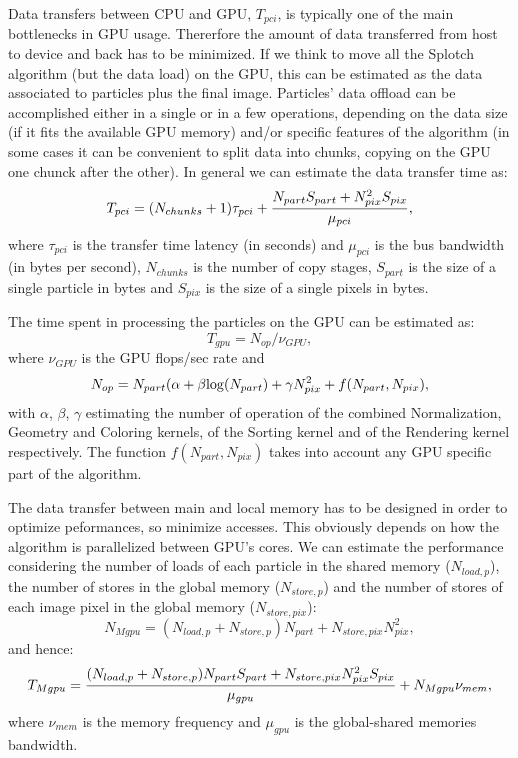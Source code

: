 \documentclass[11pt]{article}
\begin{document}
Data transfers between CPU and GPU, $T_{pci}$, is typically one of the main 
bottlenecks in GPU usage. Thererfore the amount of data transferred from host
to device and back has to be minimized. If we think to move all the Splotch
algorithm (but the data load) on the GPU, this can be estimated
as the data associated to particles plus the final image. Particles' data
offload can be accomplished either in a single or in a few operations, 
depending on the data size (if it fits the available GPU memory) and/or
specific features of the algorithm (in some cases it can be convenient to
split data into chunks, copying on the GPU one chunck after the other).
In general we can estimate the data transfer time as:
\begin{equation}
T_{pci} =  (N_{chunks}+1) \tau_{pci} + {N_{part} S_{part} + N_{pix}^2 S_{pix} \over 
\mu_{pci}},
\end{equation}
where $\tau_{pci}$ is the transfer time latency (in seconds) and $\mu_{pci}$ is the
bus bandwidth (in bytes per second), $N_{chunks}$ is the number 
of copy stages, $S_{part}$ is the size of a single particle in bytes and 
$S_{pix}$ is the size of a single pixels in bytes. 

The time spent in processing the particles on the GPU can be estimated as:
\begin{equation}
T_{gpu} = N_{op}/\nu_{GPU},
\end{equation}
where $\nu_{GPU}$ is the GPU flops/sec rate and
\begin{equation}
N_{op} = N_{part}(\alpha + \beta {\rm log}(N_{part}) + \gamma N_{pix}^2 + f(N_{part},N_{pix}),
\end{equation}
with $\alpha$, $\beta$, $\gamma$ estimating the number of operation of 
the combined Normalization, Geometry and Coloring kernels, of the 
Sorting kernel and of the Rendering kernel respectively. The function 
$f(N_{part},N_{pix})$ takes into account any GPU specific part of the algorithm. 

The data transfer between main and local memory has to be designed in 
order to optimize peformances, so minimize accesses. This obviously depends on how
the algorithm is parallelized between GPU's cores. We can estimate
the performance considering the number of loads of each particle in 
the shared memory ($N_{load,p}$), the number of stores in the global memory 
($N_{store,p}$) and the number
of stores of each image pixel in the global memory ($N_{store,pix}$):
\begin{equation}
N_{Mgpu} = (N_{load,p} + N_{store,p}) N_{part} + N_{store,pix} N_{pix}^2,
\end{equation}
and hence:
\begin{equation}
T_{Mgpu} = {(N_{load,p} + N_{store,p}) N_{part} S_{part} 
+ N_{store,pix} N_{pix}^2 S_{pix} \over \mu_{gpu}}
+ N_{Mgpu} \nu_{mem},
\end{equation}
where $\nu_{mem}$ is the memory frequency and $\mu_{gpu}$ is the global-shared memories bandwidth.
\end{document}
